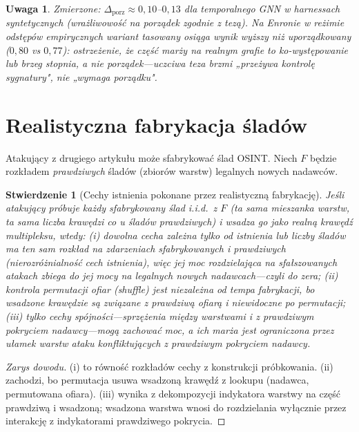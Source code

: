\documentclass[11pt]{article}
\newtheorem{proposition}[theorem]{Stwierdzenie}
\newtheorem{remark}[theorem]{Uwaga}
\begin{document}
\begin{remark}
Zmierzone: $\Delta_{\mathrm{porz}}\approx0{,}10$--$0{,}13$ dla
temporalnego GNN w harnessach syntetycznych (wrażliwowość na porządek
zgodnie z tezą). Na Enronie w reżimie odstępów empirycznych wariant
tasowany osiąga wynik \emph{wyższy} niż uporządkowany ($0{,}80$ vs
$0{,}77$): ostrzeżenie, że część marży na realnym grafie to
ko-występowanie lub brzeg stopnia, a nie porządek---uczciwa teza brzmi
„przeżywa kontrolę sygnatury", nie „wymaga porządku".
\end{remark}

\section{Realistyczna fabrykacja śladów}
\label{sec:fabrication}

Atakujący z drugiego artykułu może sfabrykować ślad OSINT. Niech $F$
będzie rozkładem \emph{prawdziwych} śladów (zbiorów warstw) legalnych
nowych nadawców.

\begin{proposition}[Cechy istnienia pokonane przez realistyczną fabrykację]
\label{prop:fab}
Jeśli atakujący próbuje każdy sfabrykowany ślad i.i.d.\ z $F$ (ta sama
mieszanka warstw, ta sama liczba krawędzi co u śladów prawdziwych) i
wsadza go jako realną krawędź multipleksu, wtedy:
(i) dowolna cecha zależna tylko od \emph{istnienia} lub \emph{liczby}
śladów ma ten sam rozkład na zdarzeniach sfabrykowanych i prawdziwych
(nierozróżnialność cech istnienia), więc jej moc rozdzielająca na
sfałszowanych atakach zbiega do jej mocy na legalnych nowych
nadawcach---czyli do zera;
(ii) kontrola permutacji ofiar (shuffle) jest niezależna od tempa
fabrykacji, bo wsadzone krawędzie są związane z prawdziwą ofiarą i
niewidoczne po permutacji;
(iii) tylko cechy \emph{spójności}---sprzężenia między warstwami i z
prawdziwym pokryciem nadawcy---mogą zachować moc, a ich marża jest
ograniczona przez ułamek warstw ataku \emph{konfliktujących} z prawdziwym
pokryciem nadawcy.
\end{proposition}

\begin{proof}[Zarys dowodu]
(i) to równość rozkładów cechy z konstrukcji próbkowania.
(ii) zachodzi, bo permutacja usuwa wsadzoną krawędź z lookupu
(nadawca, permutowana ofiara). (iii) wynika z dekompozycji indykatora
warstwy na część prawdziwą i wsadzoną; wsadzona warstwa wnosi do
rozdzielania wyłącznie przez interakcję z indykatorami prawdziwego
pokrycia.
\end{proof}
\end{document}
